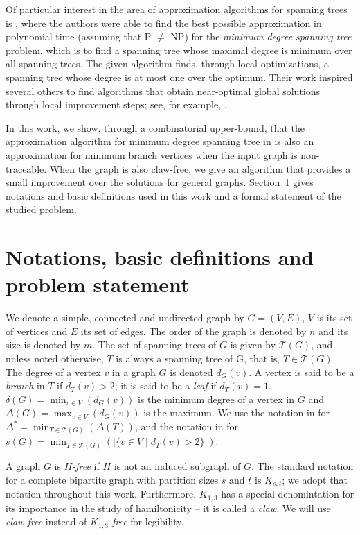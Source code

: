 \documentclass[12pt]{article}
\begin{document}
Of particular interest in the area of approximation algorithms for spanning trees is \cite{furer1992}, where the authors were able to find the best possible approximation in polynomial time (assuming that P $\neq$ NP) for the \emph{minimum degree spanning tree} problem, which is to find a spanning tree whose maximal degree is minimum over all spanning trees.
The given algorithm finds, through local optimizations, a spanning tree whose degree is at most one over the optimum. 
Their work inspired several others to find algorithms that obtain near-optimal global solutions through local improvement steps; see, for example, \cite{salamon2010, lu1996, chimani2015}.

In this work, we show, through a combinatorial upper-bound, that the approximation algorithm for minimum degree spanning tree in \cite{furer1992} is also an approximation for minimum branch vertices when the input graph is non-traceable.
When the graph is also claw-free, we give an algorithm that provides a small improvement over the solutions for general graphs.
Section~\ref{sec:notations} gives notations and basic definitions used in this work and a formal statement of the studied problem. 

\section{Notations, basic definitions and problem statement} \label{sec:notations}

We denote a simple, connected and undirected graph by $G = (V, E)$, $V$ is its set of vertices and $E$ its set of edges.
The order of the graph is denoted by $n$ and its size is denoted by $m$.
The set of spanning trees of $G$ is given by $\mathcal{T}(G)$, and unless noted otherwise, $T$ is always a spanning tree of G, that is, $T \in \mathcal{T}(G)$.
The degree of a vertex $v$ in a graph $G$ is denoted $d_G(v)$.
A vertex is said to be a \emph{branch} in $T$ if $d_T(v) > 2$; it is said to be a \emph{leaf} if $d_T(v) = 1$.
$\delta(G) = \min_{v \in V}(d_G(v))$ is the minimum degree of a vertex in $G$ and $\Delta(G) = \max_{v \in V}(d_G(v))$ is the maximum.
We use the notation in \cite{furer1992} for $\Delta^* = \min_{T \in \mathcal{T}(G)}(\Delta(T))$, and the notation in \cite{gargano2004} for $s(G) = \min_{T \in \mathcal{T}(G)}(|\{v \in V \mid d_T(v) > 2 \}|)$.

A graph $G$ is \emph{$H$-free} if $H$ is not an induced subgraph of $G$.
The standard notation for a complete bipartite graph with partition sizes $s$ and $t$ is $K_{s, t}$; we adopt that notation throughout this work.
Furthermore, $K_{1, 3}$ has a special denomintation for its importance in the study of hamiltonicity -- it is called a \emph{claw}.
We will use \emph{claw-free} instead of $K_{1,3}$\emph{-free} for legibility.
\end{document}
